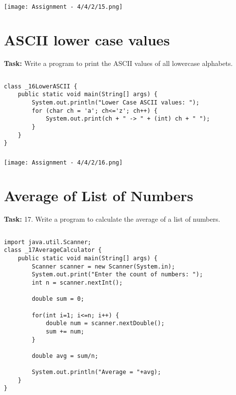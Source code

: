 \documentclass[12pt,a4paper]{article}
\begin{document}
\subsubsection{}
\begin{center}
    \texttt{[image: Assignment - 4/4/2/15.png]}
\end{center}


\section{ASCII lower case values}
\textbf{Task:} Write a program to print the ASCII values of all lowercase alphabets.

\subsection{}
\begin{lstlisting}
class _16LowerASCII {
    public static void main(String[] args) {
        System.out.println("Lower Case ASCII values: ");
        for (char ch = 'a'; ch<='z'; ch++) {
            System.out.print(ch + " -> " + (int) ch + " ");
        }
    }
}
\end{lstlisting}

\subsubsection{}
\begin{center}
    \texttt{[image: Assignment - 4/4/2/16.png]}
\end{center}


\section{Average of List of Numbers}
\textbf{Task:} 17. Write a program to calculate the average of a list of numbers.

\subsection{}
\begin{lstlisting}
import java.util.Scanner;
class _17AverageCalculator {
    public static void main(String[] args) {
        Scanner scanner = new Scanner(System.in);
        System.out.print("Enter the count of numbers: ");
        int n = scanner.nextInt();
    
        double sum = 0;
    
        for(int i=1; i<=n; i++) {
            double num = scanner.nextDouble();
            sum += num;
        }
    
        double avg = sum/n;
    
        System.out.println("Average = "+avg);
    }
}
\end{lstlisting}
\end{document}
